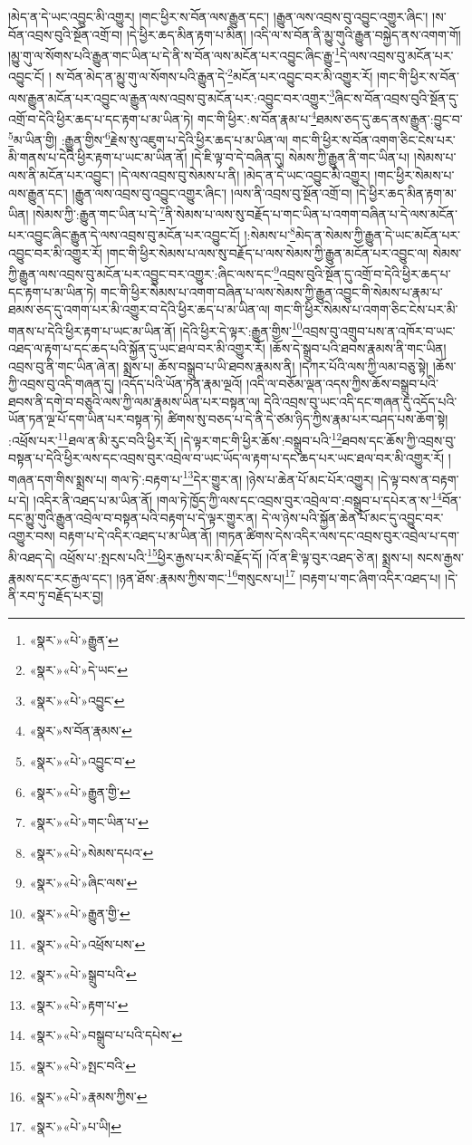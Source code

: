 །མེད་ན་དེ་ཡང་འབྱུང་མི་འགྱུར། །གང་ཕྱིར་ས་བོན་ལས་རྒྱུན་དང་། །རྒྱུན་ལས་འབྲས་བུ་འབྱུང་འགྱུར་ཞིང་། །ས་བོན་འབྲས་བུའི་སྔོན་འགྲོ་བ། །དེ་ཕྱིར་ཆད་མིན་རྟག་པ་མིན། །འདི་ལ་ས་བོན་ནི་མྱུ་གུའི་རྒྱུན་བསྐྱེད་ནས་འགག་གོ། །མྱུ་གུ་ལ་སོགས་པའི་རྒྱུན་གང་ཡིན་པ་དེ་ནི་ས་བོན་ལས་མངོན་པར་འབྱུང་ཞིང་རྒྱུ་\footnote{«སྣར་»«པེ་»རྒྱུན་}དེ་ལས་འབྲས་བུ་མངོན་པར་འབྱུང་ངོ། །
ས་བོན་མེད་ན་མྱུ་གུ་ལ་སོགས་པའི་རྒྱུན་དེ་\footnote{«སྣར་»«པེ་»དེ་ཡང་}མངོན་པར་འབྱུང་བར་མི་འགྱུར་རོ། །གང་གི་ཕྱིར་ས་བོན་ལས་རྒྱུན་མངོན་པར་འབྱུང་ལ་རྒྱུན་ལས་འབྲས་བུ་མངོན་པར་:འབྱུང་བར་འགྱུར་\footnote{«སྣར་»«པེ་»འབྱུང་}ཞིང་ས་བོན་འབྲས་བུའི་སྔོན་དུ་འགྲོ་བ་དེའི་ཕྱིར་ཆད་པ་དང་རྟག་པ་མ་ཡིན་ཏེ། གང་གི་ཕྱིར་:ས་བོན་རྣམ་པ་\footnote{«སྣར་»ས་བོན་རྣམས་}ཐམས་ཅད་དུ་ཆད་ནས་རྒྱུན་:བྱུང་བ་\footnote{«སྣར་»«པེ་»འབྱུང་བ་}མ་ཡིན་གྱི། :རྒྱུན་གྱིས་\footnote{«སྣར་»«པེ་»རྒྱུན་གྱི་}རྗེས་སུ་འཇུག་པ་དེའི་ཕྱིར་ཆད་པ་མ་ཡིན་ལ། གང་གི་ཕྱིར་ས་བོན་འགག་ཅིང་ངེས་པར་མི་གནས་པ་དེའི་ཕྱིར་རྟག་པ་ཡང་མ་ཡིན་ནོ། །དེ་ཇི་ལྟ་བ་དེ་བཞིན་དུ། སེམས་ཀྱི་རྒྱུན་ནི་གང་ཡིན་པ། །སེམས་པ་ལས་ནི་མངོན་པར་འབྱུང་། །དེ་ལས་འབྲས་བུ་སེམས་པ་ནི། །མེད་ན་དེ་ཡང་འབྱུང་མི་འགྱུར། །གང་ཕྱིར་སེམས་པ་ལས་རྒྱུན་དང་། །རྒྱུན་ལས་འབྲས་བུ་འབྱུང་འགྱུར་ཞིང་། །ལས་ནི་འབྲས་བུ་སྔོན་འགྲོ་བ། །དེ་ཕྱིར་ཆད་མིན་རྟག་མ་ཡིན། །སེམས་ཀྱི་:རྒྱུན་གང་ཡིན་པ་དེ་\footnote{«སྣར་»«པེ་»གང་ཡིན་པ་}ནི་སེམས་པ་ལས་སུ་བརྗོད་པ་གང་ཡིན་པ་འགག་བཞིན་པ་དེ་ལས་མངོན་པར་འབྱུང་ཞིང་རྒྱུན་དེ་ལས་འབྲས་བུ་མངོན་པར་འབྱུང་ངོ། །:སེམས་པ་\footnote{«སྣར་»«པེ་»སེམས་དཔའ་}མེད་ན་སེམས་ཀྱི་རྒྱུན་དེ་ཡང་མངོན་པར་འབྱུང་བར་མི་འགྱུར་རོ། །གང་གི་ཕྱིར་སེམས་པ་ལས་སུ་བརྗོད་པ་ལས་སེམས་ཀྱི་རྒྱུན་མངོན་པར་འབྱུང་ལ། སེམས་ཀྱི་རྒྱུན་ལས་འབྲས་བུ་མངོན་པར་འབྱུང་བར་འགྱུར་:ཞིང་ལས་དང་\footnote{«སྣར་»«པེ་»ཞིང་ལས་}འབྲས་བུའི་སྔོན་དུ་འགྲོ་བ་དེའི་ཕྱིར་ཆད་པ་དང་རྟག་པ་མ་ཡིན་ཏེ། གང་གི་ཕྱིར་སེམས་པ་འགག་བཞིན་པ་ལས་སེམས་ཀྱི་རྒྱུན་འབྱུང་གི་སེམས་པ་རྣམ་པ་ཐམས་ཅད་དུ་འགག་པར་མི་འགྱུར་བ་དེའི་ཕྱིར་ཆད་པ་མ་ཡིན་ལ། གང་གི་ཕྱིར་སེམས་པ་འགག་ཅིང་ངེས་པར་མི་གནས་པ་དེའི་ཕྱིར་རྟག་པ་ཡང་མ་ཡིན་ནོ། །དེའི་ཕྱིར་དེ་ལྟར་:རྒྱུན་གྱིས་\footnote{«སྣར་»«པེ་»རྒྱུན་གྱི་}འབྲས་བུ་འགྲུབ་པས་ན་འཁོར་བ་ཡང་འཐད་ལ་རྟག་པ་དང་ཆད་པའི་སྐྱོན་དུ་ཡང་ཐལ་བར་མི་འགྱུར་རོ། །ཆོས་དེ་སྒྲུབ་པའི་ཐབས་རྣམས་ནི་གང་ཡིན། འབྲས་བུ་ནི་གང་ཡིན་ཞེ་ན། སྨྲས་པ། ཆོས་བསྒྲུབ་པ་ཡི་ཐབས་རྣམས་ནི། །དཀར་པོའི་ལས་ཀྱི་ལམ་བཅུ་སྟེ། །ཆོས་ཀྱི་འབྲས་བུ་འདི་གཞན་དུ། །འདོད་པའི་ཡོན་ཏན་རྣམ་ལྔའོ། །འདི་ལ་བཅོམ་ལྡན་འདས་ཀྱིས་ཆོས་བསྒྲུབ་པའི་ཐབས་ནི་དགེ་བ་བཅུའི་ལས་ཀྱི་ལམ་རྣམས་ཡིན་པར་བསྟན་ལ། དེའི་འབྲས་བུ་ཡང་འདི་དང་གཞན་དུ་འདོད་པའི་ཡོན་ཏན་ལྔ་པོ་དག་ཡིན་པར་བསྟན་ཏེ། ཚིགས་སུ་བཅད་པ་དེ་ནི་དེ་ཙམ་ཉིད་ཀྱིས་རྣམ་པར་བཤད་པས་ཆོག་སྟེ། :འཕྲོས་པར་\footnote{«སྣར་»«པེ་»འཕྲོས་པས་}ཐལ་ན་མི་རུང་བའི་ཕྱིར་རོ། །དེ་ལྟར་གང་གི་ཕྱིར་ཆོས་:བསྒྲུབ་པའི་\footnote{«སྣར་»«པེ་»སྒྲུབ་པའི་}ཐབས་དང་ཆོས་ཀྱི་འབྲས་བུ་བསྟན་པ་དེའི་ཕྱིར་ལས་དང་འབྲས་བུར་འབྲེལ་བ་ཡང་ཡོད་ལ་རྟག་པ་དང་ཆད་པར་ཡང་ཐལ་བར་མི་འགྱུར་རོ། །གཞན་དག་གིས་སྨྲས་པ། གལ་ཏེ་:བརྟག་པ་\footnote{«སྣར་»«པེ་»རྟག་པ་}དེར་གྱུར་ན། །ཉེས་པ་ཆེན་པོ་མང་པོར་འགྱུར། །དེ་ལྟ་བས་ན་བརྟག་པ་དེ། །འདིར་ནི་འཐད་པ་མ་ཡིན་ནོ། །གལ་ཏེ་ཁྱོད་ཀྱི་ལས་དང་འབྲས་བུར་འབྲེལ་བ་:བསྒྲུབ་པ་དཔེར་ན་ས་\footnote{«སྣར་»«པེ་»བསྒྲུབ་པ་པའི་དཔེས་}བོན་དང་མྱུ་གུའི་རྒྱུན་འབྲེལ་བ་བསྟན་པའི་བརྟག་པ་དེ་ལྟར་གྱུར་ན། དེ་ལ་ཉེས་པའི་སྐྱོན་ཆེན་པོ་མང་དུ་འབྱུང་བར་འགྱུར་བས། བརྟག་པ་དེ་འདིར་འཐད་པ་མ་ཡིན་ནོ། །གཏན་ཚིགས་དེས་འདིར་ལས་དང་འབྲས་བུར་འབྲེལ་པ་དག་མི་འཐད་དེ། འཕྲོས་པ་:སྤངས་པའི་\footnote{«སྣར་»«པེ་»སྤང་བའི་}ཕྱིར་རྒྱས་པར་མི་བརྗོད་དོ། །འོ་ན་ཇི་ལྟ་བུར་འཐད་ཅེ་ན། སྨྲས་པ། སངས་རྒྱས་རྣམས་དང་རང་རྒྱལ་དང་། །ཉན་ཐོས་:རྣམས་ཀྱིས་གང་\footnote{«སྣར་»«པེ་»རྣམས་ཀྱིས་}གསུངས་པ།\footnote{«སྣར་»«པེ་»པ་ཡི།} །བརྟག་པ་གང་ཞིག་འདིར་འཐད་པ། །དེ་ནི་རབ་ཏུ་བརྗོད་པར་བྱ། 